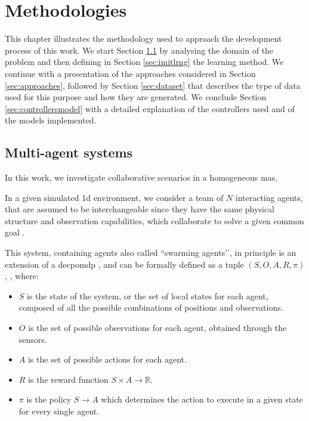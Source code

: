 \chapter{Methodologies}
\label{chap:methods}

This chapter illustrates the methodology used to approach the development 
process of this work. 
We start Section \ref{sec:MAS} by analysing the domain of the problem and then 
defining in Section \ref{sec:imitlrng} the learning method.
We continue with a presentation of the approaches considered in Section 
\ref{sec:approaches}, followed by Section \ref{sec:dataset} that describes the type 
of data used for this purpose and how they are generated.
We conclude Section \ref{sec:controllersmodel} with a detailed explanation of the 
controllers used and of the models implemented. 


\section{Multi-agent systems}
\label{sec:MAS}

In this work, we investigate collaborative scenarios in a homogeneous \gls{mas}.

In a given simulated \gls{1d} environment, we consider a team of $N$ interacting 
agents, that are assumed to be interchangeable since they have the same physical 
structure and observation capabilities, which collaborate to solve a given common 
goal \cite[][]{stone2000multiagent, vsovsic2016inverse}.

This system, containing agents also called ``swarming agents’’, in principle is an 
extension of a \gls{decpomdp} \cite[][]{oliehoek2012decentralised}, and can be 
formally defined as a tuple $(S, O, A, R, \pi)$, \cite[][]{schaal1999imitation}, 
where:
\begin{itemize}
	\item $S$ is the state of the system, or the set of local states for each agent, 
	composed of all the possible combinations of positions and observations.
	\item $O$ is the set of possible observations for each agent, obtained through 
	the sensors.
	\item $A$ is the set of possible actions for each agent.
	\item $R$ is the reward function $S \times A \rightarrow \mathbb{R}$.
	\item $\pi$ is the policy $S \rightarrow A$ which determines the action to 
	execute in a given state for every single agent.
\end{itemize}

